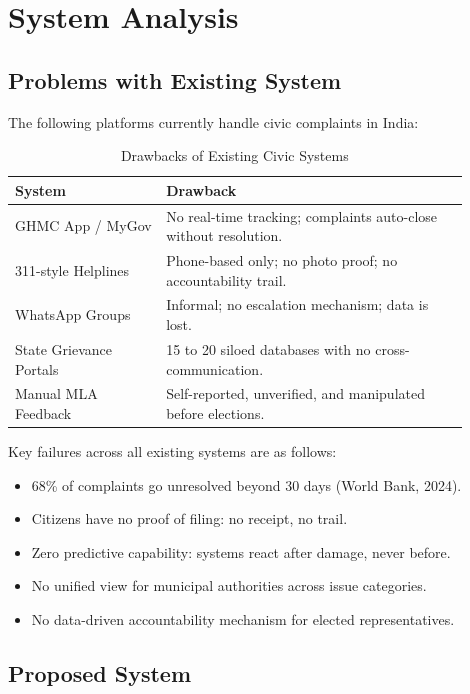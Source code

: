 \documentclass[12pt,a4paper]{report}
\begin{document}
\chapter[SYSTEM ANALYSIS]{System Analysis}

\section{Problems with Existing System}

The following platforms currently handle civic complaints in India:

\begin{table}[htbp]
\centering
\begin{tabular}{p{0.30\linewidth} p{0.60\linewidth}}
\toprule
\textbf{System} & \textbf{Drawback} \\
\midrule
GHMC App / MyGov & No real-time tracking; complaints auto-close without
resolution. \\[0.4em]
311-style Helplines & Phone-based only; no photo proof; no accountability
trail. \\[0.4em]
WhatsApp Groups & Informal; no escalation mechanism; data is lost. \\[0.4em]
State Grievance Portals & 15 to 20 siloed databases with no
cross-communication. \\[0.4em]
Manual MLA Feedback & Self-reported, unverified, and manipulated before
elections. \\
\bottomrule
\end{tabular}
\vspace{0.4em}
\caption{Drawbacks of Existing Civic Systems}
\end{table}

Key failures across all existing systems are as follows:

\begin{itemize}
    \item 68\% of complaints go unresolved beyond 30 days
    (World Bank, 2024).
    \item Citizens have no proof of filing: no receipt, no trail.
    \item Zero predictive capability: systems react after damage,
    never before.
    \item No unified view for municipal authorities across issue categories.
    \item No data-driven accountability mechanism for elected representatives.
\end{itemize}

\section{Proposed System}
\end{document}
